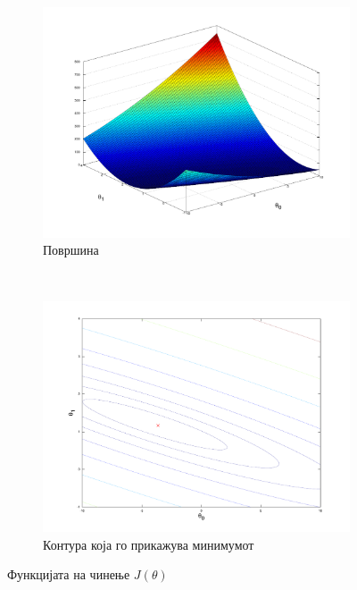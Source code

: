 \documentclass[12pt,a4paper]{article}
\begin{document}
\begin{figure}[htbp]
        \begin{subfigure}[b]{0.5\textwidth}
                \centering
                \includegraphics[width=\textwidth]{src/surface_plot}
                \caption{Површина}
                \label{fig:surface}
        \end{subfigure}%
        ~ 
        \begin{subfigure}[b]{0.5\textwidth}
                \centering
                \includegraphics[width=\textwidth]{src/contour}
                \caption{Контура која го прикажува минимумот}
                \label{fig:contour}
        \end{subfigure}
        \caption{Функцијата на чинење $J(\theta)$}
        \label{fig:cost_function}
\end{figure}
\end{document}
